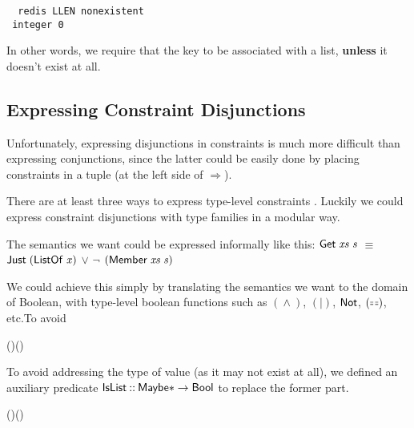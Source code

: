\begin{tabbing}\tt
~redis~LLEN~nonexistent\\
\tt ~integer~0
\end{tabbing}

In other words, we require that the key to be associated with a list,
 \textbf{unless} it doesn't exist at all.

\subsection{Expressing Constraint Disjunctions}

Unfortunately, expressing disjunctions in constraints is much more difficult
 than expressing conjunctions, since the latter could be easily done by placing
 constraints in a tuple (at the left side of \ensuremath{\Rightarrow }).

There are at least three ways to express type-level constraints
\cite{singletons}. Luckily we could express constraint disjunctions with type
 families in a modular way.

The semantics we want could be expressed informally like this:
\ensuremath{\Conid{Get}\;\Varid{xs}\;\Varid{s}} $\equiv$ \ensuremath{\Conid{Just}\;(\Conid{ListOf}\;\Varid{x})}
$\vee$ $\neg$ \ensuremath{(\Conid{Member}\;\Varid{xs}\;\Varid{s})}

We could achieve this simply by translating the semantics we want to the
 domain of Boolean, with type-level boolean functions such as
\ensuremath{(\mathrel{\wedge})},
\ensuremath{(\mid )}, \ensuremath{\Conid{Not}},
\ensuremath{(\doubleequals)}, etc.\footnotemark To avoid


\begin{hscode}\SaveRestoreHook
{}%
%
\>[B]{}\;\;\doubleequals{}\;(\;)\mathrel{\vee}\;(\;\;){}\<[E]%
\ColumnHook
\end{hscode}\resethooks

To avoid addressing the type of value (as it may not exist at all), we defined
 an auxiliary predicate \ensuremath{\Conid{IsList}\mathbin{::}\Conid{Maybe}\mathbin{*}\to \Conid{Bool}} to
 replace the former part.

\begin{hscode}\SaveRestoreHook
{}%
%
\>[B]{}\;(\;\;)\mathrel{\vee}\;(\;\;){}\<[E]%
\ColumnHook
\end{hscode}\resethooks

